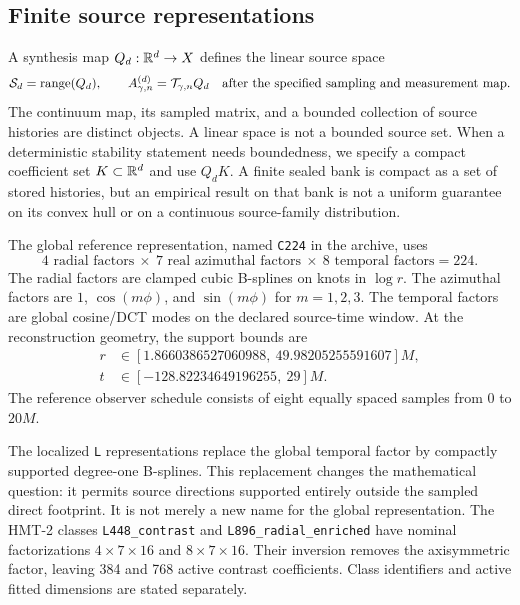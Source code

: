 \subsection{Finite source representations}
A synthesis map $Q_d:\mathbb R^d\rightarrow X$ defines the linear source space
\begin{equation}
\mathcal S_d=\operatorname{range}(Q_d),\qquad A_{\gamma,n}^{(d)}=\mathcal T_{\gamma,n}Q_d
\quad\text{after the specified sampling and measurement map}.
\label{eq:restriction}
\end{equation}
The continuum map, its sampled matrix, and a bounded collection of source histories are distinct objects. A linear space is not a bounded source set. When a deterministic stability statement needs boundedness, we specify a compact coefficient set $K\subset\mathbb R^d$ and use $Q_dK$. A finite sealed bank is compact as a set of stored histories, but an empirical result on that bank is not a uniform guarantee on its convex hull or on a continuous source-family distribution.

The global reference representation, named \texttt{C224} in the archive, uses
\begin{equation}
4\text{ radial factors}\ \times\ 7\text{ real azimuthal factors}\ \times\ 8\text{ temporal factors}=224.
\label{eq:c224}
\end{equation}
The radial factors are clamped cubic B-splines on knots in $\log r$. The azimuthal factors are $1$, $\cos(m\phi)$, and $\sin(m\phi)$ for $m=1,2,3$. The temporal factors are global cosine/DCT modes on the declared source-time window. At the reconstruction geometry, the support bounds are
\begin{align}
r&\in[1.8660386527060988,\ 49.98205255591607]M,\nonumber\\
t&\in[-128.82234649196255,\ 29]M.
\label{eq:referencebounds}
\end{align}
The reference observer schedule consists of eight equally spaced samples from $0$ to $20M$.

The localized \texttt{L} representations replace the global temporal factor by compactly supported degree-one B-splines. This replacement changes the mathematical question: it permits source directions supported entirely outside the sampled direct footprint. It is not merely a new name for the global representation. The HMT-2 classes \texttt{L448\_contrast} and \texttt{L896\_radial\_enriched} have nominal factorizations $4\times7\times16$ and $8\times7\times16$. Their inversion removes the axisymmetric factor, leaving 384 and 768 active contrast coefficients. Class identifiers and active fitted dimensions are stated separately.

